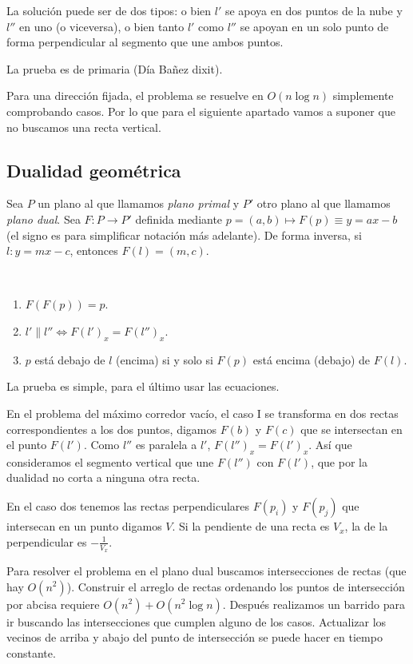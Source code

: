 \documentclass[TGyGC.tex]{subfiles}
\begin{document}
\begin{prop}

La solución puede ser de dos tipos: o bien $l'$ se apoya en dos puntos de la nube y $l''$ en uno (o viceversa), o bien tanto $l'$ como $l''$ se apoyan en un solo punto de forma perpendicular al segmento que une ambos puntos. 

\end{prop}
La prueba es de primaria (Día Bañez dixit).

Para una dirección fijada, el problema se resuelve en $O(n\log n)$ simplemente comprobando casos. Por lo que para el siguiente apartado vamos a suponer que no buscamos una recta vertical.

\subsection{Dualidad geométrica}
Sea $P$ un plano al que llamamos \emph{plano primal} y $P'$ otro plano al que llamamos \emph{plano dual}. Sea $F:P\to P'$ definida mediante $p=(a,b)\mapsto F(p)\equiv y=ax-b$ (el signo es para simplificar notación más adelante). De forma inversa, si $l: y=mx-c$, entonces $F(l)=(m,c)$. 


\begin{prop}\
\begin{enumerate}
\item $F(F(p))=p$.
\item $l'\parallel l''\Leftrightarrow F(l')_x=F(l'')_x$.
\item $p$ está debajo de $l$ (encima) si y solo si $F(p)$ está encima (debajo) de $F(l)$. 
\end{enumerate}
\end{prop}

La prueba es simple, para el último usar las ecuaciones. 

En el problema del máximo corredor vacío, el caso I se transforma en dos rectas correspondientes a los dos puntos, digamos $F(b)$ y $F(c)$ que se intersectan en el punto $F(l')$. Como $l''$ es paralela a $l'$, $F(l'')_x=F(l')_x$. Así que consideramos el segmento vertical que une $F(l'')$ con $F(l')$, que por la dualidad no corta a ninguna otra recta. 

En el caso dos tenemos las rectas perpendiculares $F(p_i)$ y $F(p_j)$ que intersecan en un punto digamos $V$. Si la pendiente de una recta es $V_x$, la de la perpendicular es $-\frac{1}{V_x}$.

Para resolver el problema en el plano dual buscamos intersecciones de rectas (que hay $O(n^2)$). Construir el arreglo de rectas ordenando los puntos de intersección por abcisa requiere $O(n^2)+O(n^2\log n)$. Después realizamos un barrido para ir buscando las intersecciones que cumplen alguno de los casos. Actualizar los vecinos de arriba y abajo del punto de intersección se puede hacer en tiempo constante.
\end{document}
